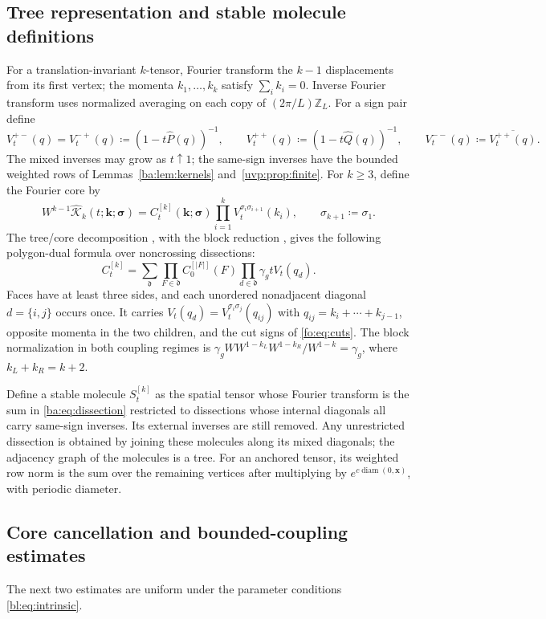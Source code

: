 \documentclass[11pt]{article}
\numberwithin{equation}{section}
\theoremstyle{remark}
\newcommand{\cK}{\mathcal K}
\begin{document}
\subsection{Tree representation and stable molecule definitions}\label{sec:bl-primitives}
For a translation-invariant $k$-tensor, Fourier transform the
$k-1$ displacements from its first vertex; the momenta
$k_1,\ldots,k_k$ satisfy $\sum_i k_i=0$. Inverse Fourier transform
uses normalized averaging on each copy of $(2\pi/L)\mathbb Z_L$.
For a sign pair define
\[
 V_t^{+-}(q)=V_t^{-+}(q)\coloneqq (1-t\widehat P(q))^{-1},\qquad
 V_t^{++}(q)\coloneqq (1-t\widehat Q(q))^{-1},\qquad
 V_t^{--}(q)\coloneqq \overline{V_t^{++}(q)}.
\]
The mixed inverses may grow as $t\uparrow1$; the same-sign inverses
have the bounded weighted rows of Lemmas~\ref{ba:lem:kernels}
and~\ref{uvp:prop:finite}. For $k\ge3$, define
the Fourier core by
\[
 W^{k-1}\widehat{\cK}_k(t;\boldsymbol k;\boldsymbol\sigma)
 =C_t^{[k]}(\boldsymbol k;\boldsymbol\sigma)
       \prod_{i=1}^k V_t^{\sigma_i\sigma_{i+1}}(k_i),
 \qquad \sigma_{k+1}\coloneqq \sigma_1.
\]
The tree/core decomposition \cite[Lemmas~4.16, 4.22, 4.25]{TYY},
with the block reduction \cite[(4.38)--(4.42)]{TYY}, gives the
following polygon-dual formula over noncrossing dissections:
\begin{equation}\label{ba:eq:dissection}
 C_t^{[k]}=\sum_{\mathfrak d}
       \prod_{F\in\mathfrak d}C_0^{[|F|]}(F)
       \prod_{d\in\mathfrak d}\gamma_g tV_t(q_d).
\end{equation}
Faces have at least three sides, and each unordered nonadjacent diagonal
$d=\{i,j\}$ occurs once. It carries
$V_t(q_d)=V_t^{\sigma_i\sigma_j}(q_{ij})$ with
$q_{ij}=k_i+\cdots+k_{j-1}$, opposite momenta in the two children,
and the cut signs of \eqref{fo:eq:cuts}.
The block normalization in both coupling regimes is
$\gamma_g W W^{1-k_L}W^{1-k_R}/W^{1-k}=\gamma_g$,
where $k_L+k_R=k+2$.

Define a stable molecule $S_t^{[k]}$ as the spatial tensor whose Fourier
transform is the sum in \eqref{ba:eq:dissection} restricted to dissections
whose internal diagonals all carry same-sign inverses. Its external inverses are
still removed. Any unrestricted dissection is obtained by joining
these molecules along its mixed diagonals; the adjacency graph of
the molecules is a tree. For an anchored tensor, its weighted row
norm is the sum over the remaining vertices after multiplying by
$e^{c\operatorname{diam}(0,\boldsymbol x)}$, with periodic diameter.

\subsection{Core cancellation and bounded-coupling estimates}\label{app:bounded-primitives}
The next two estimates are uniform under the parameter conditions
\eqref{bl:eq:intrinsic}.
\end{document}
